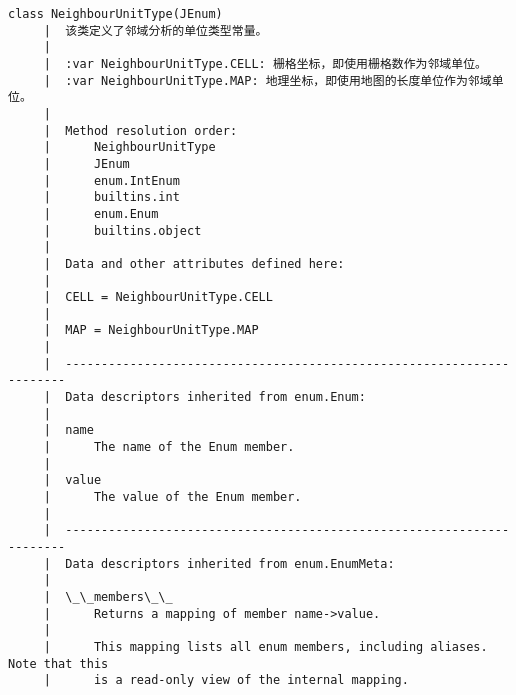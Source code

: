 \documentclass[11pt]{article}
\begin{document}
\begin{Verbatim}[commandchars=\\\{\}]
    class NeighbourUnitType(JEnum)
     |  该类定义了邻域分析的单位类型常量。
     |  
     |  :var NeighbourUnitType.CELL: 栅格坐标，即使用栅格数作为邻域单位。
     |  :var NeighbourUnitType.MAP: 地理坐标，即使用地图的长度单位作为邻域单位。
     |  
     |  Method resolution order:
     |      NeighbourUnitType
     |      JEnum
     |      enum.IntEnum
     |      builtins.int
     |      enum.Enum
     |      builtins.object
     |  
     |  Data and other attributes defined here:
     |  
     |  CELL = NeighbourUnitType.CELL
     |  
     |  MAP = NeighbourUnitType.MAP
     |  
     |  ----------------------------------------------------------------------
     |  Data descriptors inherited from enum.Enum:
     |  
     |  name
     |      The name of the Enum member.
     |  
     |  value
     |      The value of the Enum member.
     |  
     |  ----------------------------------------------------------------------
     |  Data descriptors inherited from enum.EnumMeta:
     |  
     |  \_\_members\_\_
     |      Returns a mapping of member name->value.
     |      
     |      This mapping lists all enum members, including aliases. Note that this
     |      is a read-only view of the internal mapping.
    

\end{Verbatim}
\end{document}
